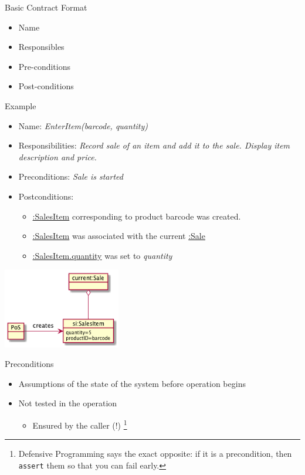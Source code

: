 \documentclass[10pt,t,a4paper]{beamer}
\begin{document}
\begin{frame}[label=sec-1-5]{Basic Contract Format}
\begin{itemize}
\item Name
\item Responsibles
\item Pre-conditions
\item Post-conditions
\end{itemize}
\end{frame}
\begin{frame}[label=sec-1-6]{Example}
\begin{itemize}
\item Name: \emph{EnterItem(barcode, quantity)}
\item Responsibilities: \emph{Record sale of an item and add it to the sale. Display item description and price.}
\item Preconditions: \emph{Sale is started}
\item Postconditions:
\begin{itemize}
\item \uline{:SalesItem} corresponding to product barcode was created.
\item \uline{:SalesItem} was associated with the current \uline{:Sale}
\item \uline{:SalesItem.quantity} was set to \emph{quantity}
\end{itemize}
\end{itemize}

\includegraphics[height=3.5cm]{FContractExample.png}
\end{frame}
\begin{frame}[fragile,label=sec-1-7]{Preconditions}
 \begin{itemize}
\item Assumptions of the state of the system before operation begins
\item Not tested in the operation
\begin{itemize}
\item Ensured by the caller (!) \footnote{Defensive Programming says the exact opposite: if it is a precondition, then \verb~assert~ them so that you can fail early.}
\end{itemize}
\end{itemize}
\end{frame}
\end{document}
